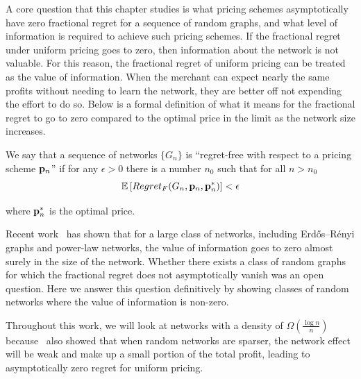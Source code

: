 A core question that this chapter studies is what pricing schemes asymptotically have zero fractional regret for a sequence of random graphs, and what level of information is required to achieve such pricing schemes. If the fractional regret under uniform pricing goes to zero, then information about the network is not valuable. For this reason, the fractional regret of uniform pricing can be treated as the value of information. When the merchant can expect nearly the same profits without needing to learn the network, they are better off not expending the effort to do so. Below is a formal definition of what it means for the fractional regret to go to zero compared to the optimal price in the limit as the network size increases.


\begin{definition}
    We say that a sequence of networks $\{G_n\}$ is ``regret-free with respect to a pricing scheme $\mathbf{p}_n$''  if for any $\epsilon > 0$ there is a number $n_0$ such that for all $n > n_0$
    \begin{equation*}
        \mathbb{E}\left[ Regret_F(G_n, \mathbf{p}_n, \mathbf{p}_n^*) \right] < \epsilon
    \end{equation*}

    where $\mathbf{p}_n^*$ is the optimal price.
\end{definition}

Recent work~\cite{huang2022value} has shown that for a large class of networks, including Erd\H{o}s--R\'{e}nyi graphs and power-law networks, the value of information goes to zero almost surely in the size of the network. Whether there exists a class of random graphs for which the fractional regret does not asymptotically vanish was an open question. Here we answer this question definitively by showing classes of random networks where the value of information is non-zero. 

Throughout this work, we will look at networks with a density of $\Omega( \frac{\log n}{n})$ because~\cite{huang2022value} also showed that when random networks are sparser, the network effect will be weak and make up a small portion of the total profit, leading to asymptotically zero regret for uniform pricing.


